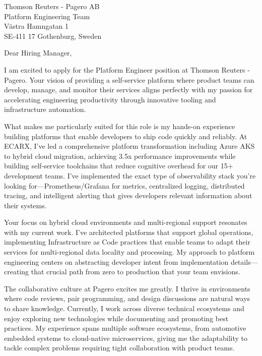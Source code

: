 \documentclass[a4paper,10pt]{article}
\begin{document}
\pagestyle{empty} %

{\color{darkblue}
Thomson Reuters - Pagero AB\\
Platform Engineering Team\\
Västra Hamngatan 1\\
SE-411 17 Gothenburg, Sweden}

\vspace{30pt}

Dear Hiring Manager,

\vspace{8pt}

I am excited to apply for the Platform Engineer position at Thomson Reuters - Pagero. Your vision of providing a self-service platform where product teams can develop, manage, and monitor their services aligns perfectly with my passion for accelerating engineering productivity through innovative tooling and infrastructure automation.

What makes me particularly suited for this role is my hands-on experience building platforms that enable developers to ship code quickly and reliably. At ECARX, I've led a comprehensive platform transformation including Azure AKS to hybrid cloud migration, achieving 3.5x performance improvements while building self-service toolchains that reduce cognitive overhead for our 15+ development teams. I've implemented the exact type of observability stack you're looking for—Prometheus/Grafana for metrics, centralized logging, distributed tracing, and intelligent alerting that gives developers relevant information about their systems.

Your focus on hybrid cloud environments and multi-regional support resonates with my current work. I've architected platforms that support global operations, implementing Infrastructure as Code practices that enable teams to adapt their services for multi-regional data locality and processing. My approach to platform engineering centers on abstracting developer intent from implementation details—creating that crucial path from zero to production that your team envisions.

The collaborative culture at Pagero excites me greatly. I thrive in environments where code reviews, pair programming, and design discussions are natural ways to share knowledge. Currently, I work across diverse technical ecosystems and enjoy exploring new technologies while documenting and promoting best practices. My experience spans multiple software ecosystems, from automotive embedded systems to cloud-native microservices, giving me the adaptability to tackle complex problems requiring tight collaboration with product teams.
\end{document}
